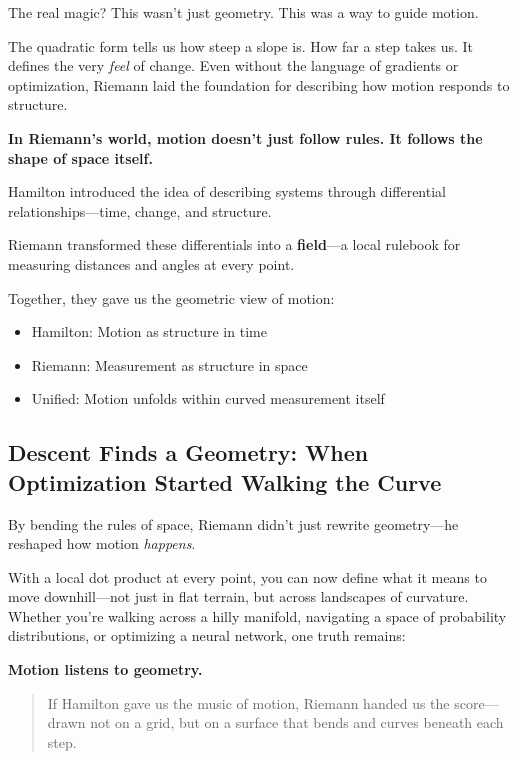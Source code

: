 The real magic? This wasn’t just geometry. This was a way to guide motion.

The quadratic form tells us how steep a slope is. How far a step takes us. It defines the very \emph{feel} of change. Even without the language of gradients or optimization, Riemann laid the foundation for describing how motion responds to structure.

\textbf{In Riemann’s world, motion doesn’t just follow rules. It follows the shape of space itself.}

\begin{tcolorbox}[colback=blue!5!white, colframe=blue!50!black,
title={Sidebar: Hamilton’s Differentials Meet Riemann’s Forms}]
Hamilton introduced the idea of describing systems through differential relationships—time, change, and structure.

Riemann transformed these differentials into a \textbf{field}—a local rulebook for measuring distances and angles at every point.

Together, they gave us the geometric view of motion:
\begin{itemize}
  \item Hamilton: Motion as structure in time
  \item Riemann: Measurement as structure in space
  \item Unified: Motion unfolds within curved measurement itself
\end{itemize}
\end{tcolorbox}


\subsection{Descent Finds a Geometry: When Optimization Started Walking the Curve}

By bending the rules of space, Riemann didn’t just rewrite geometry—he reshaped how motion \textit{happens}.

With a local dot product at every point, you can now define what it means to move downhill—not just in flat terrain, but across landscapes of curvature. Whether you're walking across a hilly manifold, navigating a space of probability distributions, or optimizing a neural network, one truth remains:

\textbf{Motion listens to geometry.}

\begin{quote}
If Hamilton gave us the music of motion,  
Riemann handed us the score—drawn not on a grid,  
but on a surface that bends and curves beneath each step.
\end{quote}


